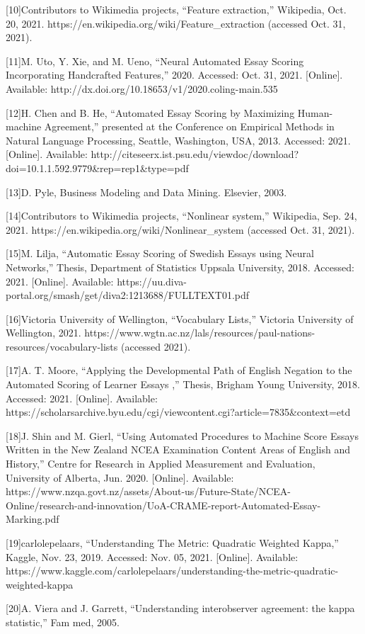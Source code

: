     [10]Contributors to Wikimedia projects, “Feature extraction,” Wikipedia, Oct. 20, 2021. https://en.wikipedia.org/wiki/Feature_extraction (accessed Oct. 31, 2021).
  

    [11]M. Uto, Y. Xie, and M. Ueno, “Neural Automated Essay Scoring Incorporating Handcrafted Features,” 2020. Accessed: Oct. 31, 2021. [Online]. Available: http://dx.doi.org/10.18653/v1/2020.coling-main.535
  

    [12]H. Chen and B. He, “Automated Essay Scoring by Maximizing Human-machine Agreement,” presented at the Conference on Empirical Methods in Natural Language Processing, Seattle, Washington, USA, 2013. Accessed: 2021. [Online]. Available: http://citeseerx.ist.psu.edu/viewdoc/download?doi=10.1.1.592.9779&rep=rep1&type=pdf
  

    [13]D. Pyle, Business Modeling and Data Mining. Elsevier, 2003.
  

    [14]Contributors to Wikimedia projects, “Nonlinear system,” Wikipedia, Sep. 24, 2021. https://en.wikipedia.org/wiki/Nonlinear_system (accessed Oct. 31, 2021).
  

    [15]M. Lilja, “Automatic Essay Scoring of Swedish Essays using Neural Networks,” Thesis, Department of Statistics Uppsala University, 2018. Accessed: 2021. [Online]. Available: https://uu.diva-portal.org/smash/get/diva2:1213688/FULLTEXT01.pdf
  

    [16]Victoria University of Wellington, “Vocabulary Lists,” Victoria University of Wellington, 2021. https://www.wgtn.ac.nz/lals/resources/paul-nations-resources/vocabulary-lists (accessed 2021).
  

    [17]A. T. Moore, “Applying the Developmental Path of English Negation to the Automated Scoring of Learner Essays ,” Thesis, Brigham Young University, 2018. Accessed: 2021. [Online]. Available: https://scholarsarchive.byu.edu/cgi/viewcontent.cgi?article=7835&context=etd
  

    [18]J. Shin and M. Gierl, “Using Automated Procedures to Machine Score Essays Written in the New Zealand NCEA Examination Content Areas of English and History,” Centre for Research in Applied Measurement and Evaluation, University of Alberta, Jun. 2020. [Online]. Available: https://www.nzqa.govt.nz/assets/About-us/Future-State/NCEA-Online/research-and-innovation/UoA-CRAME-report-Automated-Essay-Marking.pdf
  

    [19]carlolepelaars, “Understanding The Metric: Quadratic Weighted Kappa,” Kaggle, Nov. 23, 2019. Accessed: Nov. 05, 2021. [Online]. Available: https://www.kaggle.com/carlolepelaars/understanding-the-metric-quadratic-weighted-kappa
  

    [20]A. Viera and J. Garrett, “Understanding interobserver agreement: the kappa statistic,” Fam med, 2005.
  